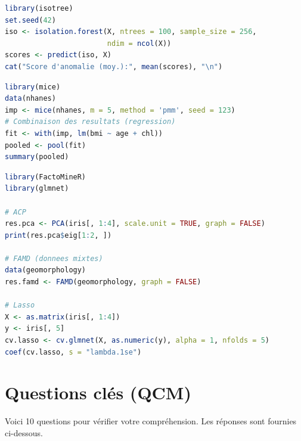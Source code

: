 \documentclass[a4paper,11pt]{article}
\theoremstyle{definition}
\theoremstyle{remark}
\begin{document}
\begin{lstlisting}[language=R, caption=Isolation Forest avec isotree]
library(isotree)
set.seed(42)
iso <- isolation.forest(X, ntrees = 100, sample_size = 256,
                        ndim = ncol(X))
scores <- predict(iso, X)
cat("Score d'anomalie (moy.):", mean(scores), "\n")
\end{lstlisting}

\begin{lstlisting}[language=R, caption=Imputation multiple avec mice]
library(mice)
data(nhanes)
imp <- mice(nhanes, m = 5, method = 'pmm', seed = 123)
# Combinaison des resultats (regression)
fit <- with(imp, lm(bmi ~ age + chl))
pooled <- pool(fit)
summary(pooled)
\end{lstlisting}

\begin{lstlisting}[language=R, caption={ACP, FAMD et Lasso}]
library(FactoMineR)
library(glmnet)

# ACP
res.pca <- PCA(iris[, 1:4], scale.unit = TRUE, graph = FALSE)
print(res.pca$eig[1:2, ])

# FAMD (donnees mixtes)
data(geomorphology)
res.famd <- FAMD(geomorphology, graph = FALSE)

# Lasso
X <- as.matrix(iris[, 1:4])
y <- iris[, 5]
cv.lasso <- cv.glmnet(X, as.numeric(y), alpha = 1, nfolds = 5)
coef(cv.lasso, s = "lambda.1se")
\end{lstlisting}

\section*{Questions clés (QCM)}


Voici 10 questions pour vérifier votre compréhension. Les réponses
sont fournies ci-dessous.
\end{document}
